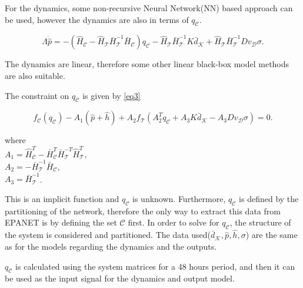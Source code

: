 For the dynamics, some non-recursive Neural Network(NN) based approach can be used, however the dynamics are also in terms of $q_\mathcal{C}$. 
 
\begin{equation}
\label{eq2}
\Lambda \dot{\hat{p}} = - (\hat{H}_{\mathcal{C}} - \hat{H}_{\mathcal{T}} \bar{H}^{-1}_{\mathcal{T}}\bar{H}_{\mathcal{C}})  q_\mathcal{C}  - \hat{H}_{\mathcal{T}} \bar{H}^{-1}_{\mathcal{T}} K \bar{d}_{\mathcal{K}} + \hat{H}_{\mathcal{T}} \bar{H}^{-1}_{\mathcal{T}} D v_{\mathcal{D}} \sigma .
\end{equation}

The dynamics are linear, therefore some other linear black-box model methods are also suitable. 

The constraint on $q_\mathcal{C}$ is given by \eqref{eq3}

 \begin{equation}
\label{eq3}
f_{\mathcal{C}}(q_\mathcal{C}) - A_1(\hat{p} + \hat{h}) + A_2 f_{\mathcal{T}}(A_2^T q_\mathcal{C} + A_3 K \bar{d}_{\mathcal{K}} - A_3 D v_{\mathcal{D}} \sigma) = 0.
\end{equation} 

\begin{minipage}[t]{0.4\textwidth}
where\\
\hspace*{6mm} $A_1 = \hat{H}^T_{\mathcal{C}} -\bar{H}^T_{\mathcal{C}}\bar{H}^{-T}_{\mathcal{T}}\hat{H}^T_{\mathcal{T}}$, \vspace*{1.5mm}  \\
\hspace*{6mm} $A_2 = -\bar{H}^{-1}_{\mathcal{T}} \bar{H}_{\mathcal{C}} $, \vspace*{1.5mm}\\
\hspace*{6mm} $A_3 = \bar{H}^{-1}_{\mathcal{T}}$. 
\end{minipage}

This is an implicit function and $q_\mathcal{C}$ is unknown. Furthermore, $q_\mathcal{C}$ is defined by the partitioning of the network, therefore the only way to extract this data from EPANET is by defining the set $\mathcal{C}$ first. In order to solve for  $q_\mathcal{C}$, the structure of the system is considered and partitioned. The data used($\bar{d}_{\mathcal{K}},\hat{p},\hat{h},\sigma$) are the same as for the models regarding the dynamics and the outputs. 

$q_\mathcal{C}$ is calculated using the system matrices for a 48 hours period, and then it can be used as the input signal for the dynamics and output model. 

